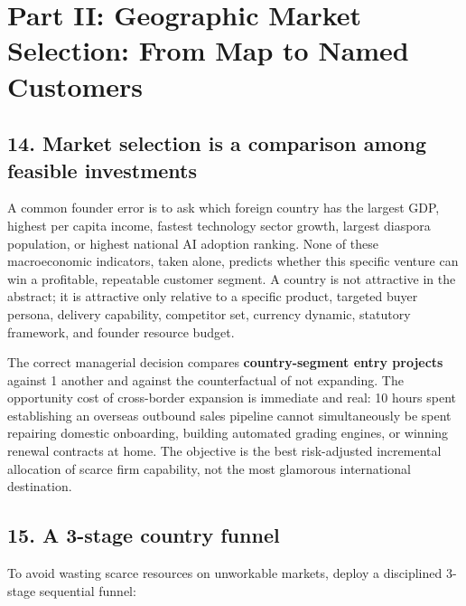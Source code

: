 \section{Part II: Geographic Market Selection: From Map to Named Customers}

\subsection{14. Market selection is a comparison among feasible investments}

A common founder error is to ask which foreign country has the largest GDP, highest per capita income, fastest technology sector growth, largest diaspora population, or highest national AI adoption ranking. None of these macroeconomic indicators, taken alone, predicts whether this specific venture can win a profitable, repeatable customer segment. A country is not attractive in the abstract; it is attractive only relative to a specific product, targeted buyer persona, delivery capability, competitor set, currency dynamic, statutory framework, and founder resource budget.

The correct managerial decision compares \textbf{country-segment entry projects} against 1 another and against the counterfactual of not expanding. The opportunity cost of cross-border expansion is immediate and real: 10 hours spent establishing an overseas outbound sales pipeline cannot simultaneously be spent repairing domestic onboarding, building automated grading engines, or winning renewal contracts at home. The objective is the best risk-adjusted incremental allocation of scarce firm capability, not the most glamorous international destination.

\subsection{15. A 3-stage country funnel}

To avoid wasting scarce resources on unworkable markets, deploy a disciplined 3-stage sequential funnel:

